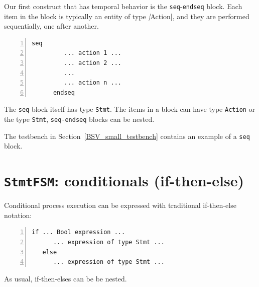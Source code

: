 
Our first construct that has temporal behavior is the
\verb|seq|-\verb|endseq| block.  Each item in the block is typically
an entity of type \emph|Action|, and they are performed sequentially,
one after another.

{\small
\begin{Verbatim}[frame=single, numbers=left]
      seq
         ... action 1 ...
         ... action 2 ...
         ...
         ... action n ...
      endseq
\end{Verbatim}
}


The \verb|seq| block itself has type \verb|Stmt|.  The items in a
block can have type \verb|Action| or the type \verb|Stmt|, {\ie}
\verb|seq-endseq| blocks can be nested.

The testbench in Section~\ref{BSV_small_testbench} contains an example
of a \verb|seq| block.


\section{{\tt StmtFSM}: conditionals (if-then-else)}


Conditional process execution can be expressed with traditional
if-then-else notation:

{\small
\begin{Verbatim}[frame=single, numbers=left]
   if ... Bool expression ...
      ... expression of type Stmt ...
   else
      ... expression of type Stmt ...
\end{Verbatim}
}

As usual, if-then-elses can be be nested.

\vspace{2ex}

